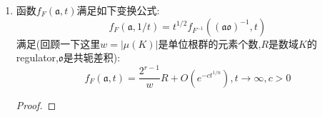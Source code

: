 \begin{enumerate}
\begin{proof}
		按照$\langle x,y\rangle=\mathrm{Tr}(({^*x})y)$,有:
		$${^*\Gamma}'=\{^*g\in\textbf{R}\mid\langle g,a\rangle\in\mathbb{Z},\forall a\in\mathfrak{a}\}=\{x\in\textbf{R}\mid\mathrm{Tr}(x\mathfrak{a})\subseteq\mathbb{Z}\}$$
		按照$\mathrm{Tr}(x\mathfrak{a})\subseteq\mathbb{Z}$,我们先证明$x\in K$:任取$\mathfrak{a}$的一组$\mathbb{Z}$基$a_1,\cdots,a_n$,记$x=\sum_ix_ia_i$,其中$x_i\in\mathbb{R}$,那么:
		$$\mathrm{Tr}(xa_j)=\sum_ix_i\mathrm{Tr}(a_ia_j)=n_j\in\mathbb{Z}$$
		是$\{x_i\}$的线性方程组,其中系数$\mathrm{Tr}(a_ia_j)\in\mathbb{Q}$.于是这些$x_i\in\mathbb{Q}$,进而$x\in K$.进而有:
		$${^*\Gamma}'=\{x\in K\mid\mathrm{Tr}(x\mathfrak{a})\subseteq\mathbb{Z}\}$$
		按照共轭差积的定义,就有$x\in{^*\Gamma}'$当且仅当$\mathrm{Tr}_{K/\mathbb{Q}}(xa\mathscr{O})\subseteq\mathbb{Z}$对任意$a\in\mathfrak{a}$成立,当且仅当$x\mathfrak{a}\subseteq\mathscr{o}^{-1}$,当且仅当$x\in(\mathfrak{a}\mathfrak{o})^{-1}$.
	\end{proof}
	\item 函数$f_F(\mathfrak{a},t)$满足如下变换公式:
	$$f_F(\mathfrak{a},1/t)=t^{1/2}f_{F^{-1}}\left((\mathfrak{a}\mathfrak{o})^{-1},t\right)$$
	满足(回顾一下这里$w=|\mu(K)|$是单位根群的元素个数,$R$是数域$K$的regulator,$\mathfrak{o}$是共轭差积):
	$$f_F(\mathfrak{a},t)=\frac{2^{r-1}}{w}R+O(e^{-ct^{1/n}}),t\to\infty,c>0$$
	\begin{proof}
		

\end{proof}
\end{enumerate}
